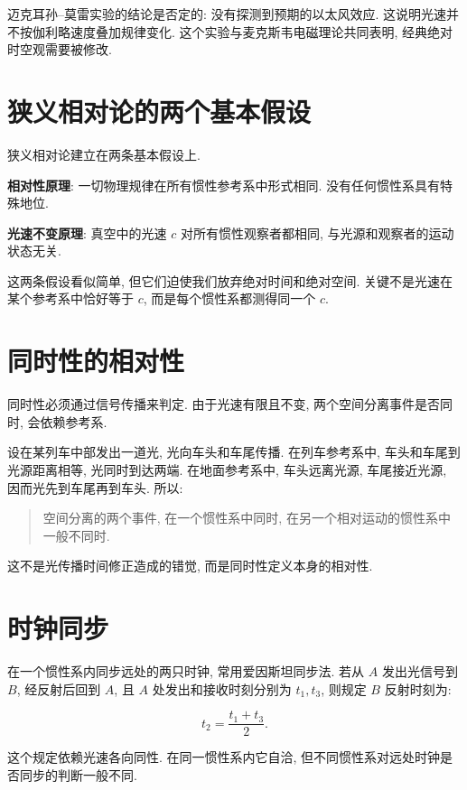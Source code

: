 \documentclass[
  a4paper,
]{ctexrep}
\begin{document}
迈克耳孙--莫雷实验的结论是否定的: 没有探测到预期的以太风效应.
这说明光速并不按伽利略速度叠加规律变化.
这个实验与麦克斯韦电磁理论共同表明, 经典绝对时空观需要被修改.

\section{狭义相对论的两个基本假设}\label{ux72edux4e49ux76f8ux5bf9ux8bbaux7684ux4e24ux4e2aux57faux672cux5047ux8bbe}

狭义相对论建立在两条基本假设上.

\textbf{相对性原理}: 一切物理规律在所有惯性参考系中形式相同.
没有任何惯性系具有特殊地位.

\textbf{光速不变原理}: 真空中的光速 \(c\) 对所有惯性观察者都相同,
与光源和观察者的运动状态无关.

这两条假设看似简单, 但它们迫使我们放弃绝对时间和绝对空间.
关键不是光速在某个参考系中恰好等于 \(c\), 而是每个惯性系都测得同一个
\(c\).

\section{同时性的相对性}\label{ux540cux65f6ux6027ux7684ux76f8ux5bf9ux6027}

同时性必须通过信号传播来判定. 由于光速有限且不变,
两个空间分离事件是否同时, 会依赖参考系.

设在某列车中部发出一道光, 光向车头和车尾传播. 在列车参考系中,
车头和车尾到光源距离相等, 光同时到达两端. 在地面参考系中, 车头远离光源,
车尾接近光源, 因而光先到车尾再到车头. 所以:

\begin{quote}
空间分离的两个事件, 在一个惯性系中同时,
在另一个相对运动的惯性系中一般不同时.
\end{quote}

这不是光传播时间修正造成的错觉, 而是同时性定义本身的相对性.

\section{时钟同步}\label{ux65f6ux949fux540cux6b65}

在一个惯性系内同步远处的两只时钟, 常用爱因斯坦同步法. 若从 \(A\)
发出光信号到 \(B\), 经反射后回到 \(A\), 且 \(A\) 处发出和接收时刻分别为
\(t_1,t_3\), 则规定 \(B\) 反射时刻为:

\[
t_2 = \frac{t_1+t_3}{2}.
\]

这个规定依赖光速各向同性. 在同一惯性系内它自洽,
但不同惯性系对远处时钟是否同步的判断一般不同.
\end{document}
